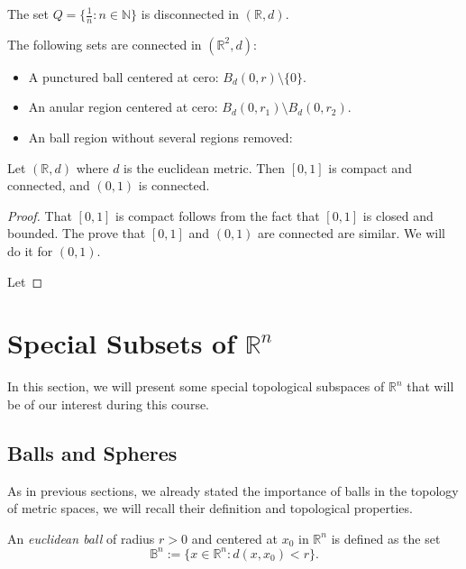 \documentclass[
	fontsize=10pt, %
	twoside=false, %
	secnumdepth=1, %
]{kaobook}
\begin{document}
\begin{example}
The set $Q=\{\frac{1}{n}:n\in\mathbb{N}\}$ is disconnected in $(\mathbb{R},d).$
\end{example}

\begin{example}
The following sets are connected in $(\mathbb{R}^2,d):$

\begin{itemize}
\item A punctured ball centered at cero: $B_d(0,r)\setminus\{0\}.$

\item An anular region centered at cero: $B_d(0,r_1)\setminus B_d(0,r_2).$

\item An ball region without several regions removed:
\end{itemize}
\end{example}

\begin{theorem}
Let $(\mathbb{R},d)$ where $d$ is the euclidean metric. Then $[0,1]$ is compact and connected, and $(0,1)$ is connected.
\end{theorem}

\begin{proof}
That $[0,1]$ is compact follows from the fact that $[0,1]$ is closed and bounded. The prove that $[0,1]$ and $(0,1)$ are connected are similar. We will do it for $(0,1).$

Let 
\end{proof}

\section{Special Subsets of $\mathbb{R}^n$}

In this section, we will present some special topological subspaces of $\mathbb{R}^n$ that will be of our interest during this course. 

\subsection{Balls and Spheres}

As in previous sections, we already stated the importance of balls in the topology of metric spaces, we will recall their definition and topological properties.

\begin{definition}
An \emph{euclidean ball} of radius $r>0$ and centered at $x_0$ in $\mathbb{R}^n$ is defined as the set $$\mathbb{B}^n:=\{x\in\mathbb{R}^n: d(x,x_0)<r\}.$$
\end{definition}
\end{document}

